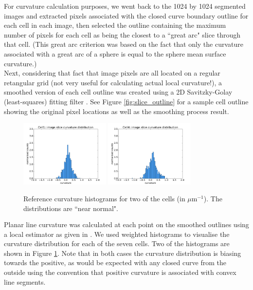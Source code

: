 \documentclass[a4paper,10pt]{article}
\begin{document}
For curvature calculation purposes, we went back to the 1024 by 1024 segmented images and extracted pixels associated with the closed curve boundary outline for each cell in each  image, then selected the outline containing the maximum number of pixels for each cell as being the closest to a ``great arc" slice through that cell. (This great arc criterion was based on the fact that only the curvature associated with a great arc of a sphere is equal to the sphere mean surface curvature.)\\

Next, considering that fact that image pixels are all located on a regular retangular grid (not very useful for calculating actual local curvature!), a smoothed version of each cell outline was created using a 2D Savitzky-Golay (least-squares) fitting filter \cite{doi:10.1021/ac60214a047}. See Figure \ref{fig:slice_outline} for a sample cell outline showing the original pixel locations as well as the smoothing process result.\\

\begin{figure}[H]
\begin{center}
\includegraphics[width=0.4\textwidth]{images/cell1_curv.pdf}
\includegraphics[width=0.4\textwidth]{images/cell4_curv.pdf}
\end{center}
\caption{Reference curvature histograms for two of the cells (in $\mu \text{m}^{-1}$). The distributions are ``near normal".}
\label{fig:ref_histogram}
\end{figure}

Planar line curvature was calculated at each point on the smoothed outlines using a local estimator as given in \cite{Rugis_2008_DSC}. We used weighted histograms to visualise the curvature distribution for each of the seven cells. Two of the histograms are shown in Figure \ref{fig:ref_histogram}. Note that in both cases the curvature distribution is biasing towards the positive, as would be expected with any closed curve from the outside using the convention that positive curvature is associated with convex line segments.\\
\end{document}
